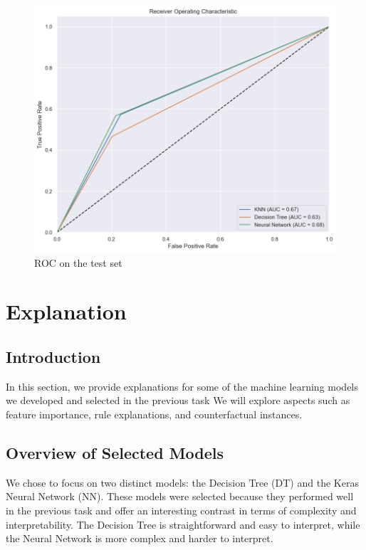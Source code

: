 \documentclass{article}
\begin{document}
\begin{figure}[H]
    \centering
    \includegraphics[width=0.5\linewidth]{testset.png}
    \caption{ROC on the test set}
    \label{fig:enter-label}
\end{figure}

































\section{Explanation}

\subsection{Introduction}
In this section, we provide explanations for some of the machine learning models we developed and selected in the previous task We will explore aspects such as feature importance, rule explanations, and counterfactual instances.

\subsection{Overview of Selected Models}
We chose to focus on two distinct models: the Decision Tree (DT) and the Keras Neural Network (NN). These models were selected because they performed well in the previous task and offer an interesting contrast in terms of complexity and interpretability. The Decision Tree is straightforward and easy to interpret, while the Neural Network is more complex and harder to interpret.
\end{document}

